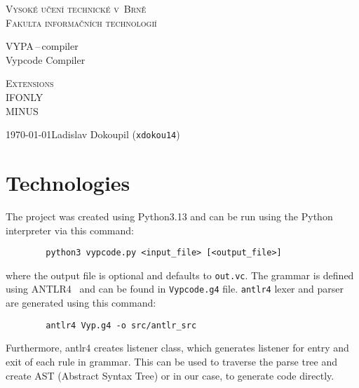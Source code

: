 \documentclass[a4paper,11pt]{article}
\begin{document}
	\begin{titlepage}
		\begin{center}
			\textsc{\Huge Vysoké učení technické v~Brně\\
				\vspace{0.4em}\huge Fakulta informačních technologií}


			{\LARGE VYPA\,--\,compiler\\
				\Huge Vypcode Compiler\\ \vspace{0.3em}}


			\textsc{{\LARGE Extensions}\\
				\vspace{0.4em} IFONLY \\
                    \vspace{0.4em} MINUS}



			{\Large \today \hfill Ladislav Dokoupil (\texttt{xdokou14})}
		\end{center}
	\end{titlepage}

    \section{Technologies}
    The project was created using Python3.13 and can be run using the Python interpreter via this command:
    \begin{verbatim}
        python3 vypcode.py <input_file> [<output_file>]
    \end{verbatim}
    where the output file is optional and defaults to \texttt{out.vc}.
    The grammar is defined using ANTLR4~\cite{antlr} and can be found in \texttt{Vypcode.g4} file.
    \texttt{antlr4} lexer and parser are generated using this command:
    \begin{verbatim}
        antlr4 Vyp.g4 -o src/antlr_src
    \end{verbatim}
    Furthermore, antlr4 creates listener class, which generates listener for entry and exit of each rule in grammar.
    This can be used to traverse the parse tree and create AST (Abstract Syntax Tree) or in our case,
    to generate code directly.
\end{document}
